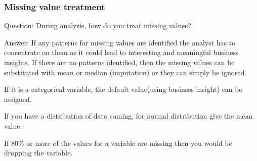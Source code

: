 \documentclass[11pt]{beamer}
\begin{document}
\begin{frame}
\frametitle{Missing value treatment}
\begin{block}{Question:}
	During analysis, how do you treat missing values?
\end{block}
\begin{block}{Answer:}
	If any patterns for missing values are identified the analyst has to concentrate on them as it could lead to interesting and meaningful business insights. If there are no patterns identified, then the missing values can be substituted with mean or median (imputation) or they can simply be ignored.
	
	If it is a categorical variable, the default value(using business insight) can be assigned.
	
	If you have a distribution of data coming, for normal distribution give the mean value.
	
	If $80\%$ or more of the values for a variable are missing then you would be dropping the variable.
\end{block}
\end{frame}
\end{document}
